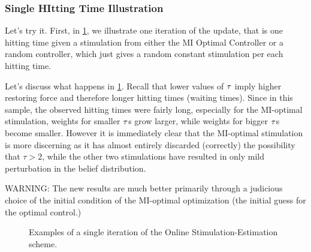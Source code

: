 \documentclass{article}
\begin{document}
\subsubsection{Single HItting Time Illustration}
Let's try it. First, in \cref{fig:example_online_miopt_single_iteration}, we
illustrate one iteration of the update, that is one hitting time given a
stimulation from either the MI Optimal Controller or a random controller, which
just gives a random constant stimulation per each hitting time.

Let's discuss what happens in \cref{fig:example_online_miopt_single_iteration}.
Recall that lower values of ${ \tau }$ imply higher restoring force and therefore
longer hitting times (waiting times). Since in this sample, the observed hitting
times were fairly long, especially for the MI-optimal stimulation, weights for
smaller ${\tau}$s grow larger, while weights for bigger ${\tau}$s become smaller.
However it is immediately clear that the MI-optimal stimulation is more
discerning as it has almost entirely discarded (correctly) the
possibility that $\tau>2$, while the other two stimulations have resulted in
only mild perturbation in the belief distribution. 

WARNING: The new results are much better primarily through a judicious choice of
the initial condition of the MI-optimal optimization (the initial guess for the
optimal control.)

\begin{figure}[h]
\begin{center}
\caption[labelInTOC]{Examples of a single iteration of the Online
Stimulation-Estimation scheme.  }
\label{fig:example_online_miopt_single_iteration}
\end{center}
\end{figure}
\end{document}

